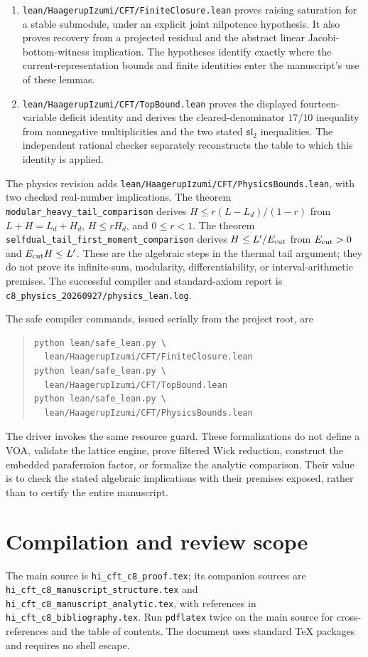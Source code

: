 \documentclass[11pt,a4paper]{article}
\theoremstyle{definition}
\newcommand{\artifact}[1]{\textnormal{\nolinkurl{#1}}}
\begin{document}
\begin{enumerate}
\item \artifact{lean/HaagerupIzumi/CFT/FiniteClosure.lean} proves
raising saturation for a stable submodule, under an explicit joint
nilpotence hypothesis. It also proves recovery from a projected
residual and the abstract linear Jacobi-bottom-witness implication.
The hypotheses identify exactly where the current-representation
bounds and finite identities enter the manuscript's use of these
lemmas.
\item \artifact{lean/HaagerupIzumi/CFT/TopBound.lean} proves the
displayed fourteen-variable deficit identity and derives the
cleared-denominator $17/10$ inequality from nonnegative
multiplicities and the two stated $\mathfrak{sl}_2$ inequalities.
The independent rational checker separately reconstructs the
table to which this identity is applied.
\end{enumerate}

The physics revision adds
\artifact{lean/HaagerupIzumi/CFT/PhysicsBounds.lean}, with two checked
real-number implications. The theorem
\artifact{modular_heavy_tail_comparison} derives
$H\leq r(L-L_d)/(1-r)$ from $L+H=L_d+H_d$, $H\leq rH_d$, and
$0\leq r<1$. The theorem
\artifact{selfdual_tail_first_moment_comparison} derives
$H\leq L'/E_{\rm cut}$ from $E_{\rm cut}>0$ and
$E_{\rm cut}H\leq L'$. These are the algebraic steps in the thermal
tail argument; they do not prove its infinite-sum, modularity,
differentiability, or interval-arithmetic premises. The successful
compiler and standard-axiom report is
\artifact{c8_physics_20260927/physics_lean.log}.

The safe compiler commands, issued serially from the project root, are
\begin{quote}\small
\begin{verbatim}
python lean/safe_lean.py \
  lean/HaagerupIzumi/CFT/FiniteClosure.lean
python lean/safe_lean.py \
  lean/HaagerupIzumi/CFT/TopBound.lean
python lean/safe_lean.py \
  lean/HaagerupIzumi/CFT/PhysicsBounds.lean
\end{verbatim}
\end{quote}
The driver invokes the same resource guard. These formalizations do
not define a VOA, validate the lattice engine, prove filtered Wick
reduction, construct the embedded parafermion factor, or formalize
the analytic comparison.
Their value is to check the stated algebraic implications with their
premises exposed, rather than to certify the entire manuscript.

\section{Compilation and review scope}\label{sec:compilation}
The main source is \artifact{hi_cft_c8_proof.tex}; its companion sources
are \artifact{hi_cft_c8_manuscript_structure.tex} and
\artifact{hi_cft_c8_manuscript_analytic.tex}, with references in
\artifact{hi_cft_c8_bibliography.tex}. Run \texttt{pdflatex} twice
on the main source for cross-references and the table of contents.
The document uses standard TeX packages and requires no shell escape.
\end{document}
